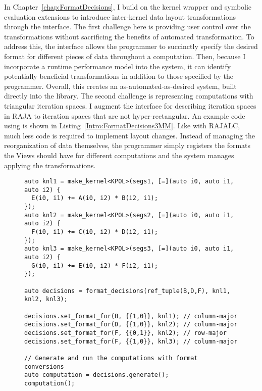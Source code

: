 In Chapter~\ref{chap:FormatDecisions}, I build on the kernel wrapper and symbolic evaluation extensions to introduce inter-kernel data layout transformations through the \FormatDecisions{} interface.
The first challenge here is providing user control over the transformations without sacrificing the benefits of automated transformation.
To address this, the interface allows the programmer to succinctly specify the desired format for different pieces of data throughout a computation.
Then, because I incorporate a runtime performance model into the system, it can identify potentially beneficial transformations in addition to those specified by the programmer.
Overall, this creates an as-automated-as-desired system, built directly into the library.
The second challenge is representing computations with triangular iteration spaces.
I augment the interface for describing iteration spaces in RAJA to iteration spaces that are not hyper-rectangular.
An example code using \FormatDecisions{} is shown in Listing~\ref{Intro:FormatDecisions3MM}.
Like with RAJALC, much less code is required to implement layout changes.
Instead of managing the reorganization of data themselves, the programmer simply registers the formats the Views should have for different computations and the system manages applying the transformations.

\begin{figure}
\begin{lstlisting}[caption={Changing data layouts for three Views in the \textsc{3mm} benchmark using \FormatDecisions.},
  label={Intro:FormatDecisions3MM}]
auto knl1 = make_kernel<KPOL>(segs1, [=](auto i0, auto i1, auto i2) {
  E(i0, i1) += A(i0, i2) * B(i2, i1);
});
auto knl2 = make_kernel<KPOL>(segs2, [=](auto i0, auto i1, auto i2) {
  F(i0, i1) += C(i0, i2) * D(i2, i1);
});
auto knl3 = make_kernel<KPOL>(segs3, [=](auto i0, auto i1, auto i2) {
  G(i0, i1) += E(i0, i2) * F(i2, i1);
});

auto decisions = format_decisions(ref_tuple(B,D,F), knl1, knl2, knl3);

decisions.set_format_for(B, {{1,0}}, knl1); // column-major
decisions.set_format_for(D, {{1,0}}, knl2); // column-major
decisions.set_format_for(F, {{0,1}}, knl2); // row-major
decisions.set_format_for(F, {{1,0}}, knl3); // column-major

// Generate and run the computations with format conversions
auto computation = decisions.generate();
computation();
\end{lstlisting}
\end{figure}

